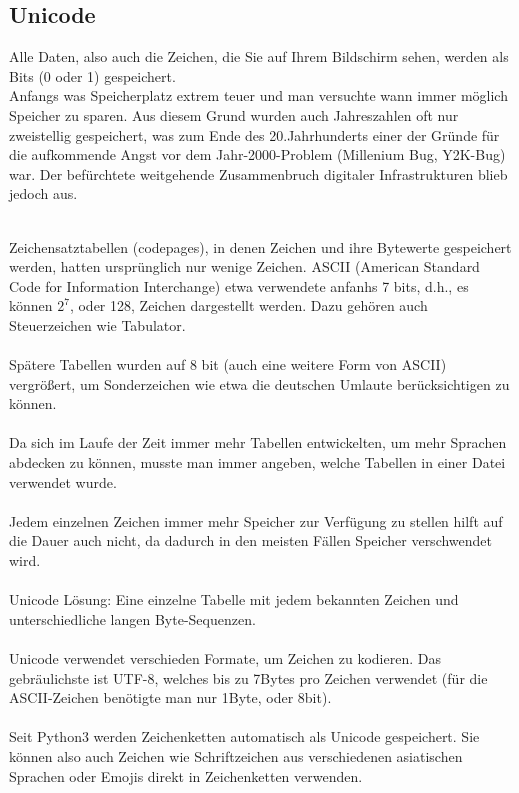 \documentclass{article}
\begin{document}
\subsection{Unicode}
Alle Daten, also auch die Zeichen, die Sie auf Ihrem Bildschirm sehen, werden als Bits (0 oder 1) gespeichert.\\
Anfangs was Speicherplatz extrem teuer und man versuchte wann immer möglich Speicher zu sparen. Aus diesem Grund wurden auch Jahreszahlen oft nur zweistellig gespeichert, was zum Ende des 20.Jahrhunderts einer der Gründe für die aufkommende Angst vor dem Jahr-2000-Problem (Millenium Bug, Y2K-Bug) war. Der befürchtete weitgehende Zusammenbruch digitaler Infrastrukturen blieb jedoch aus.\\\\

\newpage

Zeichensatztabellen (codepages), in denen Zeichen und ihre Bytewerte gespeichert werden, hatten ursprünglich nur wenige Zeichen. ASCII (American Standard Code for Information Interchange) etwa verwendete anfanhs 7 bits, d.h., es können $2^7$, oder 128, Zeichen dargestellt werden. Dazu gehören auch Steuerzeichen wie Tabulator.\\\\
Spätere Tabellen wurden auf 8 bit (auch eine weitere Form von ASCII) vergrößert, um Sonderzeichen wie etwa die deutschen Umlaute berücksichtigen zu können.\\\\
Da sich im Laufe der Zeit immer mehr Tabellen entwickelten, um mehr Sprachen abdecken zu können, musste man immer angeben, welche Tabellen in einer Datei verwendet wurde.\\\\
Jedem einzelnen Zeichen immer mehr Speicher zur Verfügung zu stellen hilft auf die Dauer auch nicht, da dadurch in den meisten Fällen Speicher verschwendet wird.\\\\
Unicode Lösung: Eine einzelne Tabelle mit jedem bekannten Zeichen und unterschiedliche langen Byte-Sequenzen.\\\\
Unicode verwendet verschieden Formate, um Zeichen zu kodieren. Das gebräulichste ist UTF-8, welches bis zu 7Bytes pro Zeichen verwendet (für die ASCII-Zeichen benötigte man nur 1Byte, oder 8bit).\\\\
Seit Python3 werden Zeichenketten automatisch als Unicode gespeichert. Sie können also auch Zeichen wie Schriftzeichen aus verschiedenen asiatischen Sprachen oder Emojis direkt in Zeichenketten verwenden.\\\\
\end{document}
